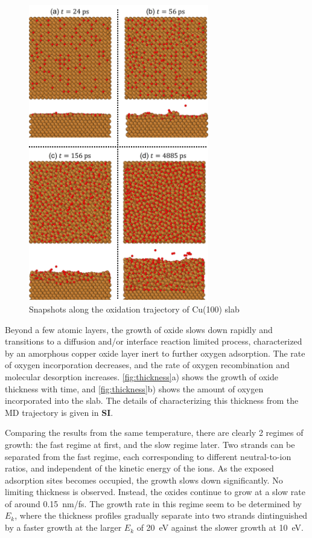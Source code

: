 \documentclass[manuscript=cmatex]{achemso}
\begin{document}
\begin{figure}[h]
  \centering
  \includegraphics[width=0.7\textwidth]{traj100}
  \caption[Snapshots along the oxidation trajectory of Cu(100) slab]{Snapshots along the oxidation trajectory of Cu(100) slab}
  \label{fig:traj}
\end{figure}
Beyond a few atomic layers, the growth of oxide slows down rapidly and transitions to a diffusion and/or interface reaction limited process, characterized by an amorphous copper oxide layer inert to further oxygen adsorption. The rate of oxygen incorporation decreases, and the rate of oxygen recombination and molecular desorption increases. \cref{fig:thickness}a) shows the growth of oxide thickness with time, and \cref{fig:thickness}b) shows the amount of oxygen incorporated into the slab. The details of characterizing this thickness from the MD trajectory is given in \textbf{SI}.

Comparing the results from the same temperature, there are clearly 2 regimes of growth: the fast regime at first, and the slow regime later. Two strands can be separated from the fast regime, each corresponding to different neutral-to-ion ratios, and independent of the kinetic energy of the ions. As the exposed adsorption sites becomes occupied, the growth slows down significantly. No limiting thickness is observed. Instead, the oxides continue to grow at a slow rate of around \SI{0.15}{nm/fs}. The growth rate in this regime seem to be determined by $E_k$, where the thickness profiles gradually separate into two strands dintinguished by a faster growth at the larger $E_k$ of \SI{20}{eV} against the slower growth at \SI{10}{eV}.
\end{document}
